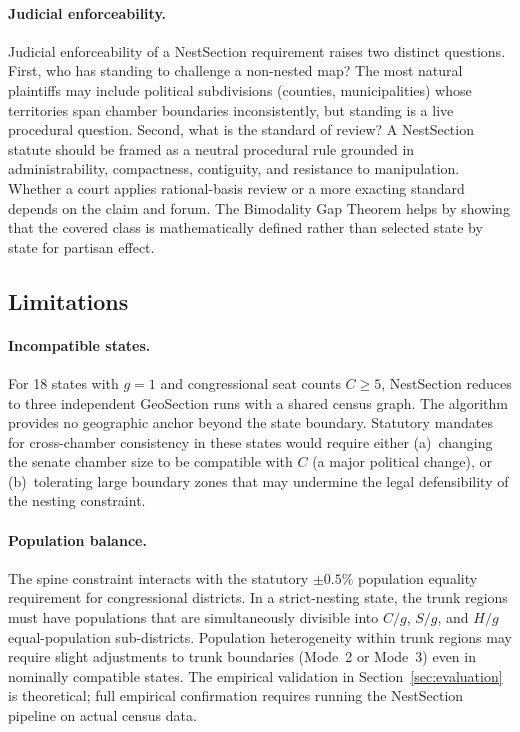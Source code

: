 \paragraph{Judicial enforceability.}
Judicial enforceability of a NestSection requirement raises two distinct
questions.  First, who has standing to challenge a non-nested map?  The most
natural plaintiffs may include political subdivisions (counties,
municipalities) whose territories span chamber boundaries inconsistently, but
standing is a live procedural question.  Second, what is the standard of
review?  A NestSection statute should be framed as a neutral procedural rule
grounded in administrability, compactness, contiguity, and resistance to
manipulation.  Whether a court applies rational-basis review or a more exacting
standard depends on the claim and forum.  The Bimodality Gap Theorem helps by
showing that the covered class is mathematically defined rather than selected
state by state for partisan effect.

\subsection{Limitations}

\paragraph{Incompatible states.}
For 18 states with $g = 1$ and congressional seat counts $C \geq 5$, NestSection
reduces to three independent GeoSection runs with a shared census graph.  The
algorithm provides no geographic anchor beyond the state boundary.  Statutory
mandates for cross-chamber consistency in these states would require either
(a)~changing the senate chamber size to be compatible with $C$ (a major
political change), or (b)~tolerating large boundary zones that may undermine
the legal defensibility of the nesting constraint.

\paragraph{Population balance.}
The spine constraint interacts with the statutory $\pm 0.5\%$ population
equality requirement for congressional districts.  In a strict-nesting state,
the trunk regions must have populations that are simultaneously divisible
into $C/g$, $S/g$, and $H/g$ equal-population sub-districts.  Population
heterogeneity within trunk regions may require slight adjustments to trunk
boundaries (Mode~2 or Mode~3) even in nominally compatible states.
The empirical validation in Section~\ref{sec:evaluation} is theoretical;
full empirical confirmation requires running the NestSection pipeline on
actual census data.

